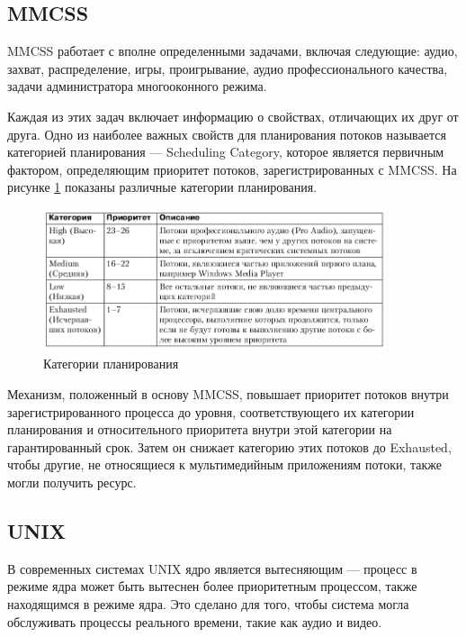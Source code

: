\documentclass[a4paper,oneside,14pt]{extarticle}
\begin{document}
\subsection*{MMCSS}

MMCSS работает с вполне определенными задачами, включая следующие: аудио, захват, распределение, игры, проигрывание, аудио профессионального качества, задачи администратора многооконного режима.

Каждая из этих задач включает информацию о свойствах, отличающих их друг от друга.
Одно из наиболее важных свойств для планирования потоков называется категорией планирования --- Scheduling Category, которое является первичным фактором, определяющим приоритет потоков, зарегистрированных с MMCSS.
На рисунке \ref{img:6} показаны различные категории планирования.

\begin{figure}[h]
	\centering
	\includegraphics[width=0.9\textwidth]{img/6.png}
    \caption{Категории планирования \cite[c.~518]{windows}}
	\label{img:6}
\end{figure}

Механизм, положенный в основу MMCSS, повышает приоритет потоков внутри зарегистрированного процесса до уровня, соответствующего их категории планирования и относительного приоритета внутри этой категории на гарантированный срок.
Затем он снижает категорию этих потоков до Exhausted, чтобы другие, не относящиеся к мультимедийным приложениям потоки, также могли получить ресурс.

\subsection{UNIX}

В современных системах UNIX ядро является вытесняющим --- процесс в режиме ядра может быть вытеснен более приоритетным процессом, также находящимся в режиме ядра.
Это сделано для того, чтобы система могла обслуживать процессы реального времени, такие как  аудио и видео.
\end{document}
